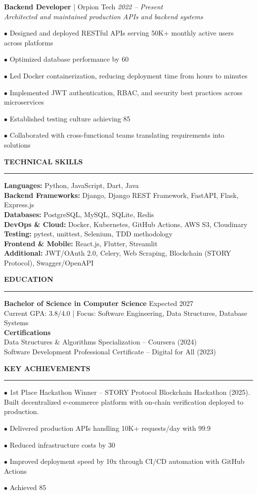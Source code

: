 \documentclass[11pt,letterpaper]{article}
\newcommand{\sectionheading}[1]{
  \vspace{6pt}
  {\large\textbf{#1}}
  \vspace{3pt}
  \hrule
  \vspace{6pt}
}
\newcommand{\jobentry}[4]{
  \textbf{#1} | #2 \hfill \textit{#3}\\
  \textit{#4}\\
}
\newcommand{\jobbullet}[1]{%
  \par\hspace{20pt}$\bullet$ #1%
}
\begin{document}
\jobentry{Backend Developer}{Orpion Tech}{2022 -- Present}{Architected and maintained production APIs and backend systems}
\jobbullet{Designed and deployed RESTful APIs serving 50K+ monthly active users across platforms}
\jobbullet{Optimized database performance by 60%
\jobbullet{Led Docker containerization, reducing deployment time from hours to minutes}
\jobbullet{Implemented JWT authentication, RBAC, and security best practices across microservices}
\jobbullet{Established testing culture achieving 85%
\jobbullet{Collaborated with cross-functional teams translating requirements into solutions}

\vspace{8pt}

\sectionheading{TECHNICAL SKILLS}

\textbf{Languages:} Python, JavaScript, Dart, Java\\
\textbf{Backend Frameworks:} Django, Django REST Framework, FastAPI, Flask, Express.js\\
\textbf{Databases:} PostgreSQL, MySQL, SQLite, Redis\\
\textbf{DevOps \& Cloud:} Docker, Kubernetes, GitHub Actions, AWS S3, Cloudinary\\
\textbf{Testing:} pytest, unittest, Selenium, TDD methodology\\
\textbf{Frontend \& Mobile:} React.js, Flutter, Streamlit\\
\textbf{Additional:} JWT/OAuth 2.0, Celery, Web Scraping, Blockchain (STORY Protocol), Swagger/OpenAPI

\sectionheading{EDUCATION}

\textbf{Bachelor of Science in Computer Science} \hfill Expected 2027\\
Current GPA: 3.8/4.0 | Focus: Software Engineering, Data Structures, Database Systems\\

\textbf{Certifications}\\
Data Structures \& Algorithms Specialization -- Coursera (2024)\\
Software Development Professional Certificate -- Digital for All (2023)

\sectionheading{KEY ACHIEVEMENTS}

\jobbullet{1st Place Hackathon Winner -- STORY Protocol Blockchain Hackathon (2025). Built decentralized e-commerce platform with on-chain verification deployed to production.}
\jobbullet{Delivered production APIs handling 10K+ requests/day with 99.9%
\jobbullet{Reduced infrastructure costs by 30%
\jobbullet{Improved deployment speed by 10x through CI/CD automation with GitHub Actions}
\jobbullet{Achieved 85%

}}}}}
\end{document}
